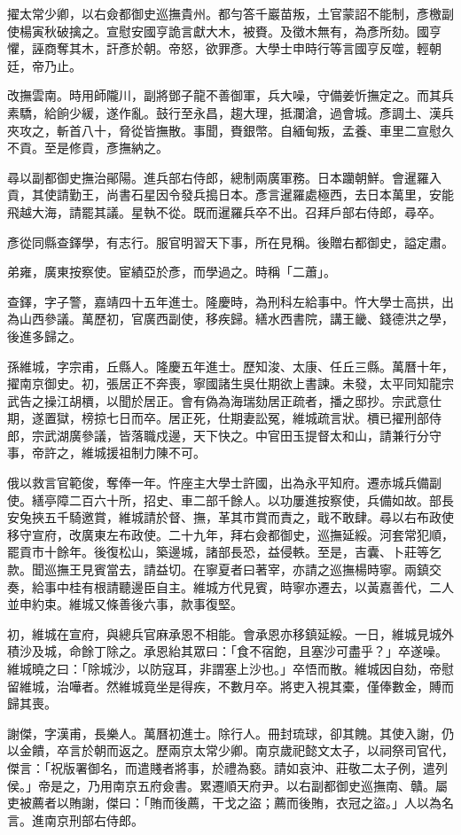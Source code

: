 \begin{pinyinscope}
擢太常少卿，以右僉都御史巡撫貴州。都勻答千巖苗叛，土官蒙詔不能制，彥檄副使楊寅秋破擒之。宣慰安國亨詭言獻大木，被賚。及徵木無有，為彥所劾。國亨懼，誣商奪其木，訐彥於朝。帝怒，欲罪彥。大學士申時行等言國亨反噬，輕朝廷，帝乃止。

改撫雲南。時用師隴川，副將鄧子龍不善御軍，兵大噪，守備姜忻撫定之。而其兵素驕，給餉少緩，遂作亂。鼓行至永昌，趨大理，抵瀾滄，過會城。彥調土、漢兵夾攻之，斬首八十，脅從皆撫散。事聞，賚銀幣。自緬甸叛，孟養、車里二宣慰久不貢。至是修貢，彥撫納之。

尋以副都御史撫治鄖陽。進兵部右侍郎，總制兩廣軍務。日本躪朝鮮。會暹羅入貢，其使請勤王，尚書石星因令發兵搗日本。彥言暹羅處極西，去日本萬里，安能飛越大海，請罷其議。星執不從。既而暹羅兵卒不出。召拜戶部右侍郎，尋卒。

彥從同縣查鐸學，有志行。服官明習天下事，所在見稱。後贈右都御史，謚定肅。

弟雍，廣東按察使。宦績亞於彥，而學過之。時稱「二蕭」。

查鐸，字子警，嘉靖四十五年進士。隆慶時，為刑科左給事中。忤大學士高拱，出為山西參議。萬歷初，官廣西副使，移疾歸。繕水西書院，講王畿、錢德洪之學，後進多歸之。

孫維城，字宗甫，丘縣人。隆慶五年進士。歷知浚、太康、任丘三縣。萬曆十年，擢南京御史。初，張居正不奔喪，寧國諸生吳仕期欲上書諫。未發，太平同知龍宗武告之操江胡檟，以聞於居正。會有偽為海瑞劾居正疏者，播之邸抄。宗武意仕期，遂置獄，榜掠七日而卒。居正死，仕期妻訟冤，維城疏言狀。檟已擢刑部侍郎，宗武湖廣參議，皆落職戍邊，天下快之。中官田玉提督太和山，請兼行分守事，帝許之，維城援祖制力陳不可。

俄以救言官範俊，奪俸一年。忤座主大學士許國，出為永平知府。遷赤城兵備副使。繕亭障二百六十所，招史、車二部千餘人。以功屢進按察使，兵備如故。部長安兔挾五千騎邀賞，維城請於督、撫，革其市賞而責之，戢不敢肆。尋以右布政使移守宣府，改廣東左布政使。二十九年，拜右僉都御史，巡撫延綏。河套常犯順，罷貢市十餘年。後復松山，築邊城，諸部長恐，益侵軼。至是，吉囊、卜莊等乞款。聞巡撫王見賓當去，請益切。在寧夏者曰著宰，亦請之巡撫楊時寧。兩鎮交奏，給事中桂有根請聽邊臣自主。維城方代見賓，時寧亦遷去，以黃嘉善代，二人並申約束。維城又條善後六事，款事復堅。

初，維城在宣府，與總兵官麻承恩不相能。會承恩亦移鎮延綏。一日，維城見城外積沙及城，命餘丁除之。承恩紿其眾曰：「食不宿飽，且塞沙可盡乎？」卒遂噪。維城曉之曰：「除城沙，以防寇耳，非謂塞上沙也。」卒悟而散。維城因自劾，帝慰留維城，治嘩者。然維城竟坐是得疾，不數月卒。將吏入視其橐，僅俸數金，賻而歸其喪。

謝傑，字漢甫，長樂人。萬曆初進士。除行人。冊封琉球，卻其餽。其使入謝，仍以金饋，卒言於朝而返之。歷兩京太常少卿。南京歲祀懿文太子，以祠祭司官代，傑言：「祝版署御名，而遣賤者將事，於禮為褻。請如哀沖、莊敬二太子例，遣列侯。」帝是之，乃用南京五府僉書。累遷順天府尹。以右副都御史巡撫南、贛。屬吏被薦者以賄謝，傑曰：「賄而後薦，干戈之盜；薦而後賄，衣冠之盜。」人以為名言。進南京刑部右侍郎。


\end{pinyinscope}
